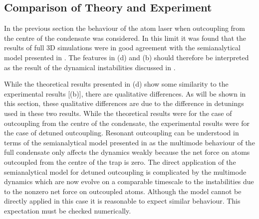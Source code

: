 \subsection{Comparison of Theory and Experiment}

In the previous section the behaviour of the atom laser when outcoupling from the centre of the condensate was considered.  In this limit it was found that the results of full 3D simulations were in good agreement with the semianalytical model presented in .  The features in (d) and (b) should therefore be interpreted as the result of the dynamical instabilities discussed in . 

While the theoretical results presented in (d) show some similarity to the experimental results [(b)], there are qualitative differences.  As will be shown in this section, these qualitative differences are due to the difference in detunings used in these two results.  While the theoretical results were for the case of outcoupling from the centre of the condensate, the experimental results were for the case of detuned outcoupling.  Resonant outcoupling can be understood in terms of the semianalytical model presented in  as the multimode behaviour of the full condensate only affects the dynamics weakly because the net force on atoms outcoupled from the centre of the trap is zero.  The direct application of the semianalytical model for detuned outcoupling is complicated by the multimode dynamics which are now evolve on a comparable timescale to the instabilities due to the nonzero net force on outcoupled atoms.  Although the model cannot be directly applied in this case it is reasonable to expect similar behaviour.  This expectation must be checked numerically.

